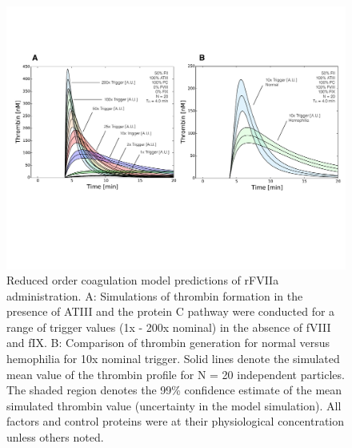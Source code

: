 \documentclass[12pt]{article}
\begin{document}
\begin{figure}
\centering
\includegraphics[width=1.0\textwidth]{./figs/Figure-7-rFVIIa-Trigger.pdf}
\caption{Reduced order coagulation model predictions of rFVIIa administration. 
A: Simulations of thrombin formation in the presence of ATIII and the protein C pathway were conducted for a range of trigger values (1x - 200x nominal) in the absence of fVIII and fIX.
B: Comparison of thrombin generation for normal versus hemophilia for 10x nominal trigger.
Solid lines denote the simulated mean value of the thrombin profile for N = 20 independent particles.
The shaded region denotes the 99\% confidence estimate of the mean simulated thrombin value (uncertainty in the model simulation). 
All factors and control proteins were at their physiological concentration unless others noted.}\label{fig-rFVII}
\end{figure}

\clearpage
\end{document}
